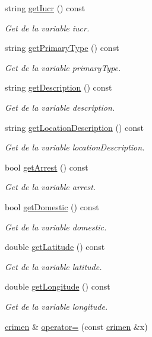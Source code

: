 \begin{DoxyCompactItemize}
string \hyperlink{classcrimen_a6d2bac20ef41f8c9944ca7deb8cc2ed5}{get\-Iucr} () const 
\begin{DoxyCompactList}\small\item\em Get de la variable iucr. \end{DoxyCompactList}\item 
string \hyperlink{classcrimen_ae47e93acec39b388cde221a679bccf9c}{get\-Primary\-Type} () const 
\begin{DoxyCompactList}\small\item\em Get de la variable primary\-Type. \end{DoxyCompactList}\item 
string \hyperlink{classcrimen_a61789d65209d167149df197272d8feba}{get\-Description} () const 
\begin{DoxyCompactList}\small\item\em Get de la variable description. \end{DoxyCompactList}\item 
string \hyperlink{classcrimen_a9de655b3eea3592f6e5d017e83fd6060}{get\-Location\-Description} () const 
\begin{DoxyCompactList}\small\item\em Get de la variable location\-Description. \end{DoxyCompactList}\item 
bool \hyperlink{classcrimen_a6cab67bfdad566ce444236fc7c8df312}{get\-Arrest} () const 
\begin{DoxyCompactList}\small\item\em Get de la variable arrest. \end{DoxyCompactList}\item 
bool \hyperlink{classcrimen_a1849e7a82111773a6919318b9cf1d05d}{get\-Domestic} () const 
\begin{DoxyCompactList}\small\item\em Get de la variable domestic. \end{DoxyCompactList}\item 
double \hyperlink{classcrimen_adfd62cd48c7d1d0259c007d3f6c39d58}{get\-Latitude} () const 
\begin{DoxyCompactList}\small\item\em Get de la variable latitude. \end{DoxyCompactList}\item 
double \hyperlink{classcrimen_a0c24726cd34dc975b3fc7c664287a15c}{get\-Longitude} () const 
\begin{DoxyCompactList}\small\item\em Get de la variable longitude. \end{DoxyCompactList}\item 
\hypertarget{classcrimen_af35890a5f72d673d82dba9c69b9fb9ab}{\hyperlink{classcrimen}{crimen} \& \hyperlink{classcrimen_af35890a5f72d673d82dba9c69b9fb9ab}{operator=} (const \hyperlink{classcrimen}{crimen} \&x)}\label{classcrimen_af35890a5f72d673d82dba9c69b9fb9ab}


\end{DoxyCompactItemize}
